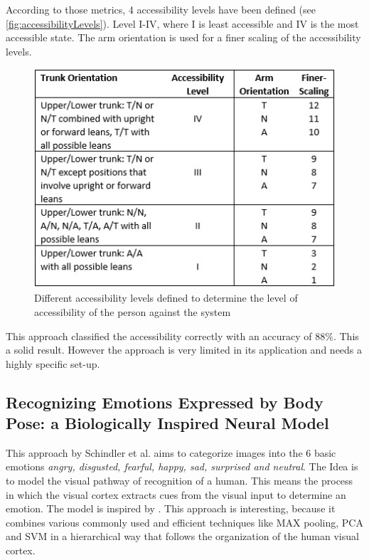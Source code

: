 \documentclass[conference]{IEEEtran}
\begin{document}
According to those metrics, 4 accessibility levels have been defined (see \autoref{fig:accessibilityLevels}). Level I-IV, where I is least accessible and IV is the most accessible state. The arm orientation is used for a finer scaling of the accessibility levels.

\begin{figure}[H]
\centering
\includegraphics[width=\linewidth]{accessibilityLevels.jpg}
\caption{Different accessibility levels defined to determine the level of accessibility of the person against the system\cite{mccoll2012affect}}
\label{fig:accessibilityLevels}
\end{figure}


This approach classified the accessibility correctly with an accuracy of 88\%. This a solid result. However the approach is very limited in its application and needs a highly specific set-up.


\subsection{Recognizing Emotions Expressed by Body Pose: a Biologically Inspired Neural Model}
This approach by Schindler et al.\cite{schindler2008recognizing} aims to categorize images into the 6 basic emotions\cite{eckman2003emotions} \emph{angry, disgusted, fearful, happy, sad, surprised and neutral}. The Idea is to model the visual pathway of recognition of a human. This means the process in which the visual cortex extracts cues from the visual input to determine an emotion\cite{schindler2008recognizing}. The model is inspired by \cite{riesenhuber1999hierarchical,serre2007robust}. This approach is interesting, because it combines various commonly used and efficient techniques like MAX pooling, PCA and SVM in a hierarchical way that follows the organization of the human visual cortex.
\end{document}
